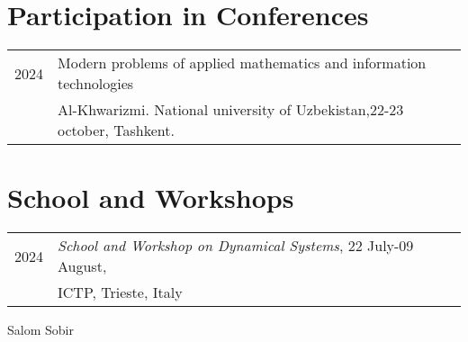 \documentclass[a4paper,10pt]{article}
\begin{document}
\section*{Participation in Conferences}
\begin{tabular}{r|p{13cm}}
2024& Modern problems of applied mathematics and information technologies\\ & Al-Khwarizmi. National university of Uzbekistan,22-23 october, Tashkent.
\end{tabular}
\section*{School and Workshops}
\begin{tabular}{r|p{11cm}}
2024 & \emph{School and Workshop on Dynamical Systems}, 22 July-09 August,\\ & ICTP, Trieste, Italy
\end{tabular}
Salom Sobir
\end{document}
